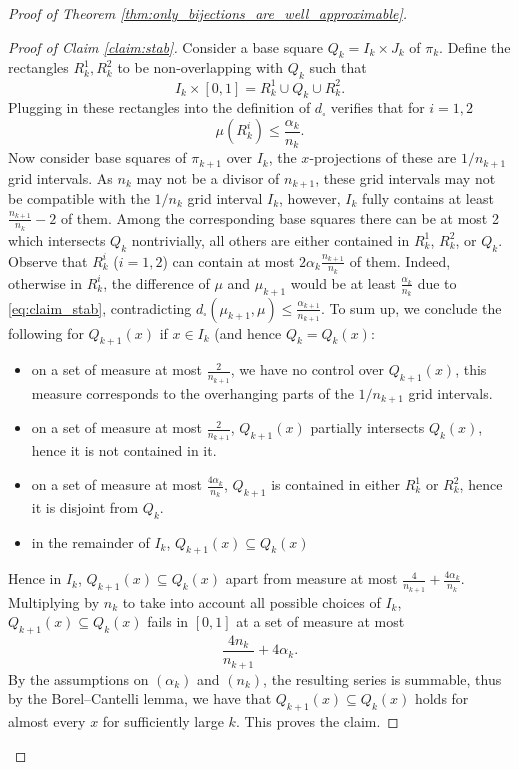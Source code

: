 \documentclass{article}
\theoremstyle{definition}
\begin{document}
\begin{proof}[Proof of Theorem \ref{thm:only_bijections_are_well_approximable}]
    \begin{proof}[Proof of Claim \ref{claim:stab}]
        Consider a base square $Q_k = I_k \times J_k$ of $\pi_k$. Define the rectangles $R_k^1, R_k^2$ to be non-overlapping with $Q_k$ such that $$I_k\times [0, 1] = R_k^1 \cup Q_k\cup R_k^2.$$
        Plugging in these rectangles into the definition of $d_\square$ verifies that for $i=1, 2$
        \begin{equation}\label{eq:claim_stab}
        \mu(R_k^i)\leq \frac{\alpha_k}{n_k}.
        \end{equation}
        Now consider base squares of $\pi_{k+1}$ over $I_k$, the $x$-projections of these are $1/n_{k+1}$ grid intervals. As $n_k$ may not be a divisor of $n_{k+1}$, these grid intervals may not be compatible with the $1/n_k$ grid interval $I_k$, however, $I_k$ fully contains at least $\frac{n_{k+1}}{n_k}-2$ of them. Among the corresponding base squares there can be at most 2 which intersects $Q_k$ nontrivially, all others are either contained in $R_k^1$, $R_k^2$, or $Q_k$. Observe that $R_k^i$ ($i=1, 2$) can contain at most $2\alpha_k \frac{n_{k+1}}{n_k}$ of them. Indeed, otherwise in $R_k^i$, the difference of $\mu$ and $\mu_{k+1}$ would be at least $\frac{\alpha_k}{n_k}$ due to \eqref{eq:claim_stab}, contradicting $d_\square(\mu_{k+1}, \mu)\leq \frac{\alpha_{k+1}}{n_{k+1}}$. To sum up, we conclude the following for $Q_{k+1}(x)$ if $x\in I_k$ (and hence $Q_k = Q_k(x)$:
        \begin{itemize}
            \item on a set of measure at most $\frac{2}{n_{k+1}}$, we have no control over $Q_{k+1}(x)$, this measure corresponds to the overhanging parts of the $1/n_{k+1}$ grid intervals.
            \item on a set of measure at most $\frac{2}{n_{k+1}}$, $Q_{k+1}(x)$ partially intersects $Q_k(x)$, hence it is not contained in it.
            \item on a set of measure at most $\frac{4\alpha_k}{n_k}$, $Q_{k+1}$ is contained in either $R_k^1$ or $R_k^2$, hence it is disjoint from $Q_k$.
            \item in the remainder of $I_k$, $Q_{k+1}(x)\subseteq Q_k(x)$
        \end{itemize}
        Hence in $I_k$, $Q_{k+1}(x)\subseteq Q_k(x)$ apart from measure at most $\frac{4}{n_{k+1}} + \frac{4\alpha_k}{n_k}$.
        Multiplying by $n_k$ to take into account all possible choices of $I_k$, $Q_{k+1}(x)\subseteq Q_k(x)$ fails in $[0,1]$ at a set of measure at most
        $$\frac{4n_k}{n_{k+1}} + 4\alpha_k.$$
        By the assumptions on $(\alpha_k)$ and $(n_k)$, the resulting series is summable, thus by the Borel--Cantelli lemma, we have that $Q_{k+1}(x)\subseteq Q_k(x)$ holds for almost every $x$ for sufficiently large $k$. This proves the claim.
    \end{proof}


\end{proof}
\end{document}
